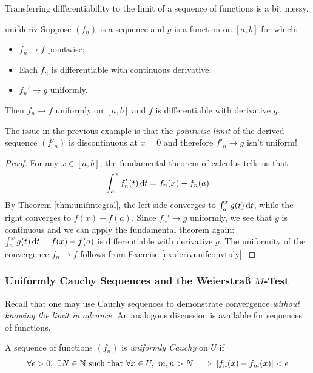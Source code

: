 Transferring differentiability to the limit of a sequence of functions is a bit messy.

\begin{thm}{}{unifderiv}
Suppose $(f_n)$ is a sequence and $g$ is a function on $[a,b]$ for which:
\begin{itemize}
  \item $f_n\to f$ pointwise;
  \item Each $f_n$ is differentiable with continuous derivative;\footnotemark
  \item $f_n'\to g$ uniformly.
\end{itemize}
Then $f_n\to f$ uniformly on $[a,b]$ and $f$ is differentiable with derivative $g$.
\end{thm}


The issue in the previous example is that the \emph{pointwise limit} of the derived sequence $(f'_n)$ is discontinuous at $x=0$ and therefore $f'_n\to g$ isn't uniform! 

\begin{proof}
For any $x\in [a,b]$, the fundamental theorem of calculus tells us that
\[\int_a^x f'_n(t)\,{\mathrm{d} t}  = f_n(x)-f_n(a)\]
By Theorem \ref{thm:unifintegral}, the left side converges to $\int_a^x g(t)\,{\mathrm{d} t}$, while the right converges to $f(x)-f(a)$. Since $f_n'\to g$ uniformly, we see that $g$ is continuous and we can apply the fundamental theorem again: $\int_a^xg(t)\,{\mathrm{d} t}=f(x)-f(a)$ is differentiable with derivative $g$.\smallbreak
The uniformity of the convergence $f_n\to f$ follows from Exercise \ref{ex:derivunifconvtidy}.
\end{proof}


\subsubsection*{Uniformly Cauchy Sequences and the Weierstraß $M$-Test}

Recall that one may use Cauchy sequences to demonstrate convergence \emph{without knowing the limit in advance.} An analogous discussion is available for sequences of functions.


\begin{defn}{}{}
A sequence of functions $(f_n)$ is \emph{uniformly Cauchy} on $U$ if
\[\forall\epsilon>0,\ \exists N\in\N \text{ such that }\forall x\in U,\ m,n>N\implies\nm{f_n(x)-f_m(x)}<\epsilon\]
\end{defn}

